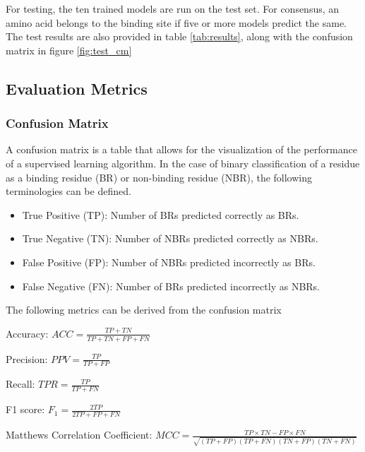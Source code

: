 \documentclass[journal=jacsat,manuscript=article]{achemso}
\begin{document}
For testing, the ten trained models are run on the test set. For consensus, an amino acid belongs to the binding site if five or more models predict the same. The test results are also provided in table \ref{tab:results}, along with the confusion matrix in figure \ref{fig:test_cm}

\subsection{Evaluation Metrics}
\subsubsection{Confusion Matrix}
A confusion matrix is a table that allows for the visualization of the performance of a supervised learning algorithm. In the case of binary classification of a residue as a binding residue (BR) or non-binding residue (NBR), the following terminologies can be defined.
\begin{itemize}
    \item True Positive (TP): Number of BRs predicted correctly as BRs.
    \item True Negative (TN): Number of NBRs predicted correctly as NBRs.
    \item False Positive (FP): Number of NBRs predicted incorrectly as BRs.
    \item False Negative (FN): Number of BRs predicted incorrectly as NBRs.
\end{itemize}

\noindent The following metrics can be derived from the confusion matrix

Accuracy: ${ACC} = \frac{TP + TN}{TP + TN + FP + FN}$

Precision: ${PPV} = \frac{TP}{TP + FP}$

Recall: ${TPR} = \frac{TP}{TP + FN}$

F1 score: ${F_1} = \frac{2TP}{2TP + FP + FN}$

Matthews Correlation Coefficient: ${MCC} = \frac{TP \times TN - FP \times FN}{\sqrt{(TP + FP)(TP + FN)(TN + FP)(TN + FN)}}$
\end{document}
